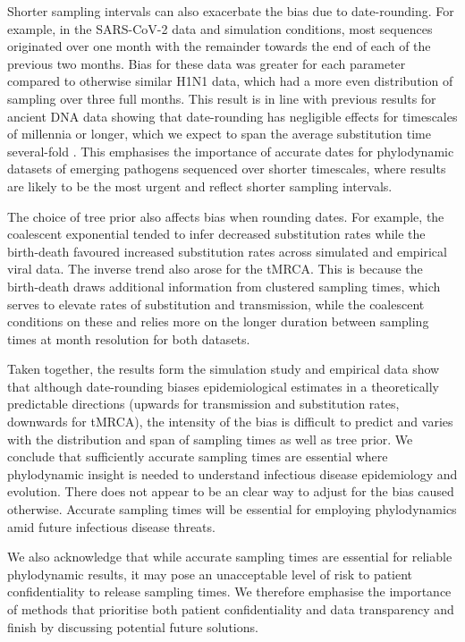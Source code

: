 \documentclass[12pt]{article}
\begin{document}
\begin{spacing}{2}
Shorter sampling intervals can also exacerbate the bias due to date-rounding. For example, in the SARS-CoV-2 data and simulation conditions, most sequences originated over one month with the remainder towards the end of each of the previous two months. Bias for these data was greater for each parameter compared to otherwise similar H1N1 data, which had a more even distribution of sampling over three full months. This result is in line with previous results for ancient DNA data showing that date-rounding has negligible effects for timescales of millennia or longer, which we expect to span the average substitution time several-fold \citep{molak_2013_phylogenetic}. This emphasises the importance of accurate dates for phylodynamic datasets of emerging pathogens sequenced over shorter timescales, where results are likely to be the most urgent and reflect shorter sampling intervals.

The choice of tree prior also affects bias when rounding dates. For example, the coalescent exponential tended to infer decreased substitution rates while the birth-death favoured increased substitution rates across simulated and empirical viral data. The inverse trend also arose for the tMRCA. This is because the birth-death draws additional information from clustered sampling times, which serves to elevate rates of substitution and transmission, while the coalescent conditions on these and relies more on the longer duration between sampling times at month resolution for both datasets. 

Taken together, the results form the simulation study and empirical data show that although date-rounding biases epidemiological estimates in a theoretically predictable directions (upwards for transmission and substitution rates, downwards for tMRCA), the intensity of the bias is difficult to predict and varies with the distribution and span of sampling times as well as tree prior. We conclude that sufficiently accurate sampling times are essential where phylodynamic insight is needed to understand infectious disease epidemiology and evolution. There does not appear to be an clear way to adjust for the bias caused otherwise. Accurate sampling times will be essential for employing phylodynamics amid future infectious disease threats.

We also acknowledge that while accurate sampling times are essential for reliable phylodynamic results, it may pose an unacceptable level of risk to patient confidentiality to release sampling times. We therefore emphasise the importance of methods that prioritise both patient confidentiality and data transparency and finish by discussing potential future solutions.


\end{spacing}
\end{document}
